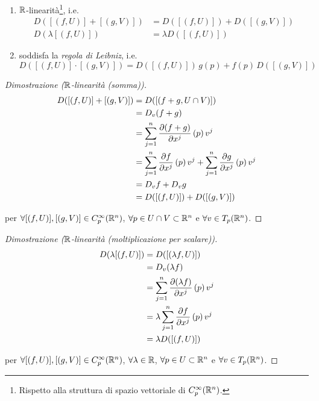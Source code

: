 \begin{enumerate}
	\item $ \mathbb{R} $-linearità\footnote{%
		Rispetto alla struttura di spazio vettoriale di $ C_{p}^{\infty}(\mathbb{R}^{n}) $.%
	}, i.e.
		\begin{align}
			D ([(f,U)] + [(g,V)]) &= D ([(f,U)]) + D ([(g,V)])\\
			D (\lambda [(f,U)]) &= \lambda D ([(f,U)])
		\end{align}
	
	\item soddisfa la \textit{regola di Leibniz}, i.e.
		\begin{equation}
			D ([(f,U)] \cdot [(g,V)]) = D ([(f,U)]) \, g(p) + f(p) \, D ([(g,V)])
		\end{equation}
\end{enumerate}

\begin{proof}[Dimostrazione ($ \mathbb{R} $-linearità (somma))]
	\begin{align}
		\begin{split}
			D ([(f,U)] + [(g,V)]) &= D ([(f+g,U \cap V)])\\
			&= D_{v} (f+g)\\
			&= \sum_{j=1}^{n} \pdv{(f+g)}{x^{j}} \, (p) \, v^{j}\\
			&= \sum_{j=1}^{n} \pdv{f}{x^{j}} \, (p) \, v^{j} + \sum_{j=1}^{n} \pdv{g}{x^{j}} \, (p) \, v^{j}\\
			&= D_{v} f + D_{v} g\\
			&= D ([(f,U)]) + D ([(g,V)])
		\end{split}
	\end{align}

	per $ \forall [(f,U)], [(g,V)] \in C_{p}^{\infty}(\mathbb{R}^{n}) $, $ \forall p \in U \cap V \subset \mathbb{R}^{n} $ e $ \forall v \in T_{p} (\mathbb{R}^{n}) $.
\end{proof}

\begin{proof}[Dimostrazione ($ \mathbb{R} $-linearità (moltiplicazione per scalare))]
	\begin{align}
		\begin{split}
			D (\lambda [(f,U)]) &= D ([(\lambda f,U)])\\
			&= D_{v} (\lambda f)\\
			&= \sum_{j=1}^{n} \pdv{(\lambda f)}{x^{j}} \, (p) \, v^{j}\\
			&= \lambda \sum_{j=1}^{n} \pdv{f}{x^{j}} \, (p) \, v^{j}\\
			&= \lambda D ([(f,U)])
		\end{split}
	\end{align}

	per $ \forall [(f,U)], [(g,V)] \in C_{p}^{\infty}(\mathbb{R}^{n}) $, $ \forall \lambda \in \mathbb{R} $, $ \forall p \in U \subset \mathbb{R}^{n} $ e $ \forall v \in T_{p} (\mathbb{R}^{n}) $.
\end{proof}

